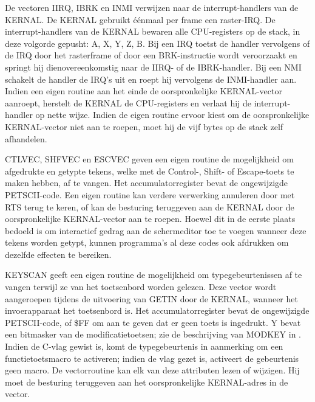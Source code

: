 \begin{description}[leftmargin=2cm,style=nextline]
        De vectoren IIRQ, IBRK en INMI verwijzen naar de interrupt-handlers van de KERNAL. De KERNAL gebruikt éénmaal per frame een raster-IRQ. De interrupt-handlers van de KERNAL bewaren alle CPU-registers op de stack, in deze volgorde gepusht: A, X, Y, Z, B. Bij een IRQ toetst de handler vervolgens of de IRQ door het rasterframe of door een BRK-instructie wordt veroorzaakt en springt hij dienovereenkomstig naar de IIRQ- of de IBRK-handler. Bij een NMI schakelt de handler de IRQ's uit en roept hij vervolgens de INMI-handler aan. Indien een eigen routine aan het einde de oorspronkelijke KERNAL-vector aanroept, herstelt de KERNAL de CPU-registers en verlaat hij de interrupt-handler op nette wijze. Indien de eigen routine ervoor kiest om de oorspronkelijke KERNAL-vector niet aan te roepen, moet hij de vijf bytes op de stack zelf afhandelen.

        CTLVEC, SHFVEC en ESCVEC geven een eigen routine de mogelijkheid om afgedrukte en getypte tekens, welke met de Control-, Shift- of Escape-toets te maken hebben, af te vangen. Het accumulatorregister bevat de ongewijzigde PETSCII-code. Een eigen routine kan verdere verwerking annuleren door met RTS terug te keren, of kan de besturing teruggeven aan de KERNAL door de oorspronkelijke KERNAL-vector aan te roepen. Hoewel dit in de eerste plaats bedoeld is om interactief gedrag aan de schermeditor toe te voegen wanneer deze tekens worden getypt, kunnen programma's al deze codes ook afdrukken om dezelfde effecten te bereiken.

        KEYSCAN geeft een eigen routine de mogelijkheid om typegebeurtenissen af te vangen terwijl ze van het toetsenbord worden gelezen. Deze vector wordt aangeroepen tijdens de uitvoering van GETIN door de KERNAL, wanneer het invoerapparaat het toetsenbord is. Het accumulatorregister bevat de ongewijzigde PETSCII-code, of \$FF om aan te geven dat er geen toets is ingedrukt. Y bevat een bitmasker van de modificatietoetsen; zie de beschrijving van MODKEY in . Indien de C-vlag gewist is, komt de typegebeurtenis in aanmerking om een functietoetsmacro te activeren; indien de vlag gezet is, activeert de gebeurtenis geen macro. De vectorroutine kan elk van deze attributen lezen of wijzigen. Hij moet de besturing teruggeven aan het oorspronkelijke KERNAL-adres in de vector.


\end{description}
